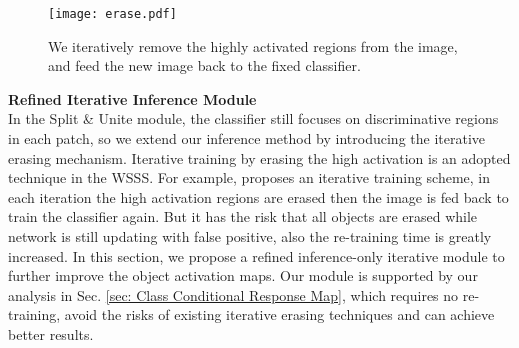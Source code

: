 \documentclass[10pt,twocolumn,letterpaper]{article}
\begin{document}
\begin{figure}[t!]
  \begin{center}
  {\texttt{[image: erase.pdf]}}
  \end{center}
    \vspace{-3mm}
\caption{
We iteratively remove the highly activated regions from the image, and
feed the new image back to the fixed classifier.
}
\vspace{-2mm}
  \label{fig: iterative}
\end{figure}



















\noindent\textbf{Refined Iterative Inference Module}\\
In the Split \& Unite module, the classifier still focuses on discriminative regions in each patch,
so we extend our inference method by introducing the iterative erasing mechanism.
Iterative training by erasing the high activation is an adopted technique in the WSSS.
For example, \cite{wei2017object} proposes an iterative training scheme, in each iteration the high activation regions are erased then the image is fed back to train the classifier again.
But it has the risk that all objects are erased while network is still updating with false positive, also the re-training time is greatly increased.
In this section, we propose a refined inference-only iterative module to further improve the object activation maps. Our module is supported by our analysis in Sec. \ref{sec: Class Conditional Response Map}, which
requires no re-training, avoid the risks of existing iterative erasing techniques and can achieve better results.
\end{document}
